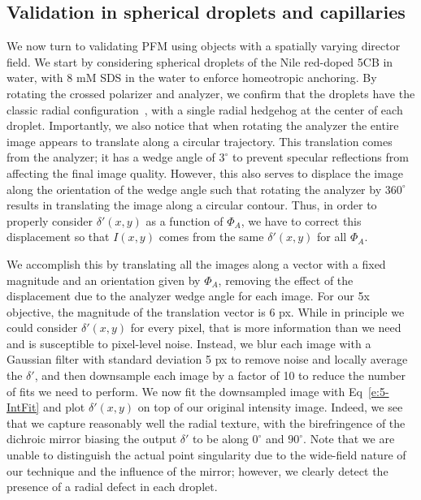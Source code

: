 \subsection{Validation in spherical droplets and capillaries}
We now turn to validating PFM using objects with a spatially varying director field.
We start by considering spherical droplets of the Nile red-doped 5CB in water, with 8 mM SDS in the water to enforce homeotropic anchoring.
By rotating the crossed polarizer and analyzer, we confirm that the droplets have the classic radial configuration~\cite{RN177}, with a single radial hedgehog at the center of each droplet.
Importantly, we also notice that when rotating the analyzer the entire image appears to translate along a circular trajectory.
This translation comes from the analyzer; it has a wedge angle of $3^{\circ}$ to prevent specular reflections from affecting the final image quality.
However, this also serves to displace the image along the orientation of the wedge angle such that rotating the analyzer by $360^{\circ}$ results in translating the image along a circular contour.
Thus, in order to properly consider $\delta'(x,y)$ as a function of $\Phi_A$, we have to correct this displacement so that $I(x,y)$ comes from the same $\delta'(x,y)$ for all $\Phi_A$.

We accomplish this by translating all the images along a vector with a fixed magnitude and an orientation given by $\Phi_A$, removing the effect of the displacement due to the analyzer wedge angle for each image.
For our 5x objective, the magnitude of the translation vector is 6 px.
While in principle we could consider $\delta'(x,y)$ for every pixel, that is more information than we need and is susceptible to pixel-level noise.
Instead, we blur each image with a Gaussian filter with standard deviation 5 px to remove noise and locally average the $\delta'$, and then downsample each image by a factor of 10 to reduce the number of fits we need to perform.
We now fit the downsampled image with Eq~\ref{e:5-IntFit} and plot $\delta'(x,y)$ on top of our original intensity image.
Indeed, we see that we capture reasonably well the radial texture, with the birefringence of the dichroic mirror biasing the output $\delta'$ to be along $0^{\circ}$ and $90^{\circ}$.
Note that we are unable to distinguish the actual point singularity due to the wide-field nature of our technique and the influence of the mirror; however, we clearly detect the presence of a radial defect in each droplet.

